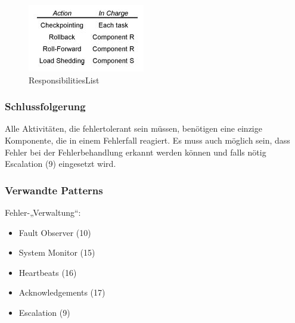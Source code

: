 \begin{figure}[H]
	\centering
	\includegraphics{content/faulttolerance/images/ResponsibilitiesList.JPG}
	\caption{ResponsibilitiesList}
\end{figure}


\subsubsection*{Schlussfolgerung}

Alle Aktivitäten, die fehlertolerant sein müssen, benötigen eine einzige Komponente, die in einem Fehlerfall reagiert.
Es muss auch möglich sein, dass Fehler bei der Fehlerbehandlung erkannt werden können und falls nötig Escalation (9) eingesetzt wird.

\subsubsection*{Verwandte Patterns}

Fehler-„Verwaltung“:
\begin{itemize}
	\item Fault Observer (10)
	\item System Monitor (15)
\end{itemize}

\begin{itemize}
	\item Heartbeats (16)
	\item Acknowledgements (17)
\end{itemize}

\begin{itemize}
	\item Escalation (9)
\end{itemize}

